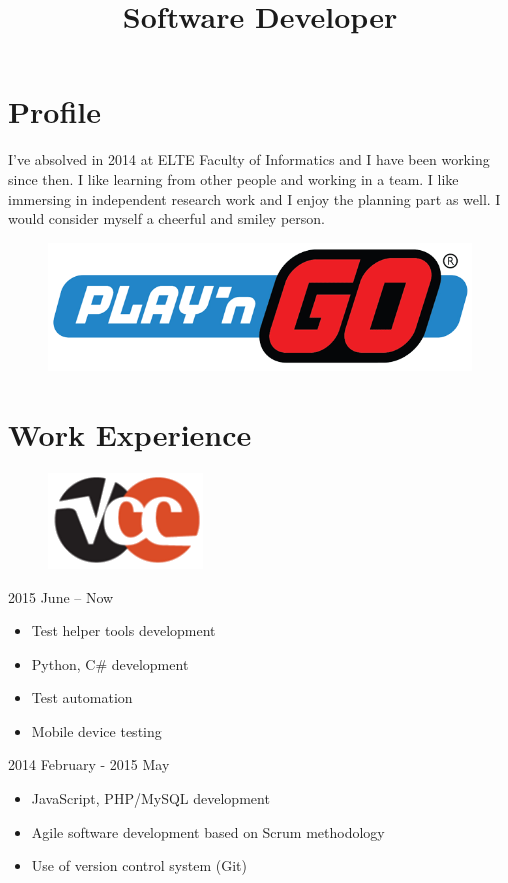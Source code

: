 \documentclass[12pt,a4paper,sans]{moderncv}   %
\title{Software Developer}                          %
\begin{document}
\makecvtitle
\section{Profile}
I've absolved in 2014 at ELTE Faculty of Informatics and I have been working since then. I like learning from other people and working in a team. I like immersing in independent research work and I enjoy the planning part as well. I would consider myself a cheerful and smiley person.

\begin{figure}
  \bigskip
  \bigskip
  \includegraphics[width=0.2\linewidth, right]{play-n-go-logo.png}
\end{figure}

\section{Work Experience}

\begin{figure}
  \bigskip
  \bigskip
  \bigskip
  \bigskip
  \includegraphics[width=0.1\linewidth, right]{vcc-logo.png}
\end{figure}

{
  2015 June -- Now
  \begin{itemize}%
  \item Test helper tools development
  \item Python, C\# development
  \item Test automation
  \item Mobile device testing
  \end{itemize}
}

{
  2014 February - 2015 May
  \begin{itemize}%
  \item JavaScript, PHP/MySQL development
  \item Agile software development based on Scrum methodology
  \item Use of version control system (Git)
  \end{itemize}
}
\end{document}
